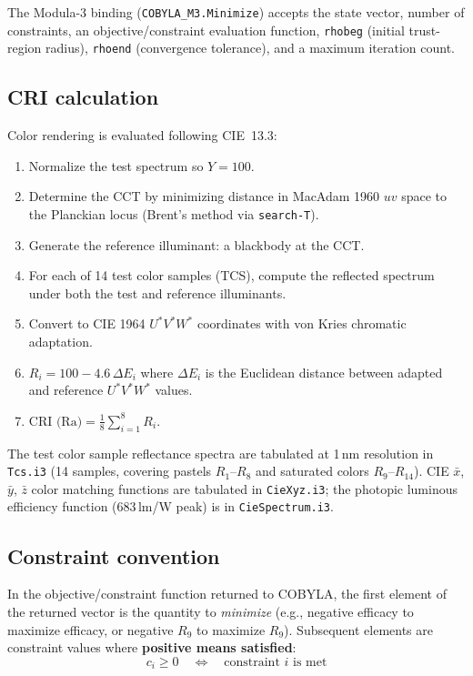\documentclass[11pt]{article}
\newcommand{\cmd}[1]{\texttt{#1}}
\newcommand{\file}[1]{\texttt{#1}}
\begin{document}
The Modula-3 binding (\cmd{COBYLA\_M3.Minimize}) accepts the state
vector, number of constraints, an objective/constraint evaluation
function, \cmd{rhobeg} (initial trust-region radius), \cmd{rhoend}
(convergence tolerance), and a maximum iteration count.

\subsection{CRI calculation}

Color rendering is evaluated following CIE~13.3:
\begin{enumerate}
  \item Normalize the test spectrum so $Y = 100$.
  \item Determine the CCT by minimizing distance in MacAdam 1960 $uv$
    space to the Planckian locus (Brent's method via \cmd{search-T}).
  \item Generate the reference illuminant: a blackbody at the CCT.
  \item For each of 14 test color samples (TCS), compute the reflected
    spectrum under both the test and reference illuminants.
  \item Convert to CIE 1964 $U^*V^*W^*$ coordinates with von Kries
    chromatic adaptation.
  \item $R_i = 100 - 4.6 \, \Delta E_i$ where $\Delta E_i$ is the
    Euclidean distance between adapted and reference $U^*V^*W^*$ values.
  \item $\text{CRI (Ra)} = \frac{1}{8}\sum_{i=1}^{8} R_i$.
\end{enumerate}

The test color sample reflectance spectra are tabulated at 1\,nm
resolution in \file{Tcs.i3} (14 samples, covering pastels $R_1$--$R_8$
and saturated colors $R_9$--$R_{14}$).  CIE $\bar{x}$, $\bar{y}$,
$\bar{z}$ color matching functions are tabulated in \file{CieXyz.i3};
the photopic luminous efficiency function (683\,lm/W peak) is in
\file{CieSpectrum.i3}.

\subsection{Constraint convention}

In the objective/constraint function returned to COBYLA, the first
element of the returned vector is the quantity to \emph{minimize} (e.g.,
negative efficacy to maximize efficacy, or negative $R_9$ to maximize
$R_9$).  Subsequent elements are constraint values where
\textbf{positive means satisfied}:
\[
  c_i \geq 0 \quad \Longleftrightarrow \quad \text{constraint $i$ is met}
\]
\end{document}
